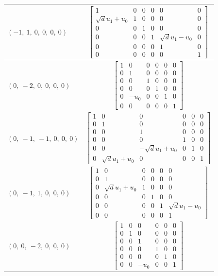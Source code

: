 \documentclass[11pt]{article}
\theoremstyle{definition}
\begin{document}
\begin{longtable}{|l|c|}
    \hline
    $\left( -1, \  1, \  0, \  0, \  0, \  0\right)$ & ${\left[\begin{matrix}1 & 0 & 0 & 0 & 0 & 0\\\sqrt{d} u_{1} + u_{0} & 1 & 0 & 0 & 0 & 0\\0 & 0 & 1 & 0 & 0 & 0\\0 & 0 & 0 & 1 & \sqrt{d} u_{1} - u_{0} & 0\\0 & 0 & 0 & 0 & 1 & 0\\0 & 0 & 0 & 0 & 0 & 1\end{matrix}\right]}$ \\
    \hline
    $\left( 0, \  -2, \  0, \  0, \  0, \  0\right)$ & ${\left[\begin{matrix}1 & 0 & 0 & 0 & 0 & 0\\0 & 1 & 0 & 0 & 0 & 0\\0 & 0 & 1 & 0 & 0 & 0\\0 & 0 & 0 & 1 & 0 & 0\\0 & - u_{0} & 0 & 0 & 1 & 0\\0 & 0 & 0 & 0 & 0 & 1\end{matrix}\right]}$ \\
    \hline
    $\left( 0, \  -1, \  -1, \  0, \  0, \  0\right)$ & ${\left[\begin{matrix}1 & 0 & 0 & 0 & 0 & 0\\0 & 1 & 0 & 0 & 0 & 0\\0 & 0 & 1 & 0 & 0 & 0\\0 & 0 & 0 & 1 & 0 & 0\\0 & 0 & - \sqrt{d} u_{1} + u_{0} & 0 & 1 & 0\\0 & \sqrt{d} u_{1} + u_{0} & 0 & 0 & 0 & 1\end{matrix}\right]}$ \\
    \hline
    $\left( 0, \  -1, \  1, \  0, \  0, \  0\right)$ & ${\left[\begin{matrix}1 & 0 & 0 & 0 & 0 & 0\\0 & 1 & 0 & 0 & 0 & 0\\0 & \sqrt{d} u_{1} + u_{0} & 1 & 0 & 0 & 0\\0 & 0 & 0 & 1 & 0 & 0\\0 & 0 & 0 & 0 & 1 & \sqrt{d} u_{1} - u_{0}\\0 & 0 & 0 & 0 & 0 & 1\end{matrix}\right]}$ \\
    \hline
    $\left( 0, \  0, \  -2, \  0, \  0, \  0\right)$ & ${\left[\begin{matrix}1 & 0 & 0 & 0 & 0 & 0\\0 & 1 & 0 & 0 & 0 & 0\\0 & 0 & 1 & 0 & 0 & 0\\0 & 0 & 0 & 1 & 0 & 0\\0 & 0 & 0 & 0 & 1 & 0\\0 & 0 & - u_{0} & 0 & 0 & 1\end{matrix}\right]}$ \\

\end{longtable}
\end{document}
